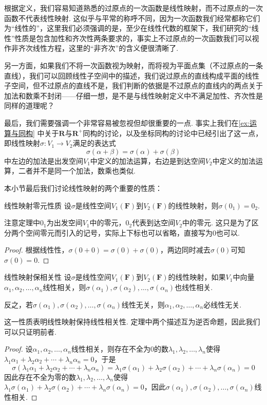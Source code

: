 根据定义，我们容易知道熟悉的过原点的一次函数是线性映射，而不过原点的一次函数不代表线性映射. 这似乎与平常的称呼不同，因为一次函数我们经常都称它们为``线性的''，这里我们必须强调的是，至少在线性代数的框架下，我们研究的``线性''性质是包含加性和齐次性两条要求的，事实上不过原点的一次函数我们可以视作非齐次线性方程，这里的``非齐次''的含义便很清晰了.

另一方面，如果我们不将一次函数视为映射，而将视为平面点集（不过原点的一条直线），我们可以回顾线性子空间中的描述，我们说过原点的直线构成平面的线性子空间，但不过原点的直线不是，我们判断的依据是不过原点的直线内的两点关于加法和数乘不封闭——仔细一想，是不是与线性映射定义中不满足加性、齐次性是同样的道理呢？

最后，我们需要强调一个非常容易被忽视但却很重要的一点. 事实上我们在\autoref{ex:运算与同构} 中关于$\mathbf{R}$与$\mathbf{R}^+$同构的讨论，以及坐标同构的讨论中已经引出了这一点，即线性映射$\sigma:V_1\to V_2$满足的表达式
\[\sigma(\alpha+\beta)=\sigma(\alpha)+\sigma(\beta)\]
中左边的加法是出发空间$V_1$中定义的加法运算，右边是到达空间$V_2$中定义的加法运算，二者并不是同一个加法，数乘也类似. %

本小节最后我们讨论线性映射的两个重要的性质：
\begin{theorem}{}{线性映射零元性质}
    设$\sigma$是线性空间$V_1(\mathbf{F})$到$V_2(\mathbf{F})$的线性映射，则$\sigma(0_1)=0_2$.
\end{theorem}
注意定理中$0_1$为出发空间$V_1$中的零元，$0_2$代表到达空间$V_2$中的零元. 这只是为了区分两个空间零元而引入的记号，实际上下标也可以省略，直接写为0也可以.

\begin{proof}
    根据线性性，$\sigma(0+0)=\sigma(0)+\sigma(0)$，两边同时减去$\sigma(0)$可知$\sigma(0)=0$.
\end{proof}

\begin{theorem}{}{线性映射保相关性}
    设$\sigma$是线性空间$V_1(\mathbf{F})$到$V_2(\mathbf{F})$的线性映射，如果$V_1$中向量$\alpha_1,\alpha_2,\ldots,\alpha_n$线性相关，则$\sigma(\alpha_1),\sigma(\alpha_2),\ldots,\sigma(\alpha_n)$也线性相关.

    反之，若$\sigma(\alpha_1),\sigma(\alpha_2),\ldots,\sigma(\alpha_n)$线性无关，则$\alpha_1,\alpha_2,\ldots,\alpha_n$必线性无关.
\end{theorem}
这一性质表明线性映射保持线性相关性. 定理中两个描述互为逆否命题，因此我们可以只证明前者.

\begin{proof}
    设$\alpha_1,\alpha_2,\ldots,\alpha_n$线性相关，则存在不全为0的数$\lambda_1,\lambda_2,\ldots,\lambda_n$使得$\lambda_1\alpha_1+\lambda_2\alpha_2+\cdots+\lambda_n\alpha_n=0$，于是
    \[\sigma(\lambda_1\alpha_1+\lambda_2\alpha_2+\cdots+\lambda_n\alpha_n)=\lambda_1\sigma(\alpha_1)+\lambda_2\sigma(\alpha_2)+\cdots+\lambda_n\sigma(\alpha_n)=0\]
    因此存在不全为零的数$\lambda_1,\lambda_2,\ldots,\lambda_n$使得$\lambda_1\sigma(\alpha_1)+\lambda_2\sigma(\alpha_2)+\cdots+\lambda_n\sigma(\alpha_n)=0$，因此$\sigma(\alpha_1),\sigma(\alpha_2),\ldots,\sigma(\alpha_n)$线性相关.
\end{proof}

